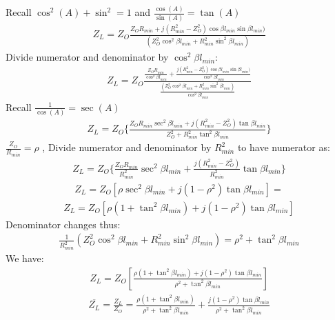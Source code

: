 Recall $ \cos^{2}(A) + \sin^{2} = 1 $ and $ \frac{\cos(A)}{\sin(A)} = \tan(A) $
\begin{align}
Z_{L} = Z_{O}\frac{Z_{O}R_{min} + j(R_{min}^{2}-Z_{O}^{2})\cos\beta l_{min}\sin\beta l_{min})}{(Z_{O}^{2}\cos^{2}\beta l_{min} + R_{min}^{2}\sin^{2}\beta l_{min})}
\end{align}
Divide numerator and denominator by $\cos^{2}\beta l_{min}$:
\begin{align*}
Z_{L} = Z_{O}\frac{\frac{Z_{O}R_{min}}{\cos^{2}\beta l_{min}} + \frac{j(R_{min}^{2}-Z_{O}^{2})\cos\beta l_{min}\sin\beta l_{min})}{\cos^{2}\beta l_{min}}}{\frac{(Z_{O}^{2}\cos^{2}\beta l_{min} + R_{min}^{2}\sin^{2}\beta l_{min})}{\cos^{2}\beta l_{min}}}
\end{align*}
Recall $ \frac{1}{\cos(A)} = \sec(A) $
\begin{align}
Z_{L} = Z_{O}\{\frac{Z_{O}R_{min}\sec^{2}\beta l_{min} + j(R_{min}^{2}-Z_{O}^{2})\tan\beta l_{min}}{Z_{O}^{2}+ R_{min}^{2}\tan^{2}\beta l_{min}}\}
\end{align}
$\frac{Z_{O}}{R_{min}} = \rho$ , Divide numerator and denominator by $R_{min}^{2}$ to have numerator as:
\begin{align*}
Z_{L} = Z_{O}\{\frac{Z_{O}R_{min}}{R_{min}^{2}}\sec^{2}\beta l_{min} + \frac{j(R_{min}^{2}-Z_{O}^{2})}{{R_{min}^{2}}}\tan\beta l_{min}\}
\end{align*}
\begin{align*}
Z_{L} = Z_{O} [\rho \sec^{2}\beta l_{min} + j(1-\rho^{2})\tan\beta l_{min}] =
\end{align*}
\begin{align*}
Z_{L} = Z_{O} [ \rho (1 + \tan^{2}\beta l_{min}) + j(1-\rho^{2})\tan\beta l_{min}]
\end{align*}
Denominator changes thus:
\begin{align*}
\frac{1}{R_{min}^{2}}{(Z_{O}^{2}\cos^{2}\beta l_{min} + R_{min}^{2}\sin^{2}\beta l_{min})} = \rho^{2} + \tan^{2}\beta l_{min}
\end{align*}
We have:
\begin{align}
Z_{L} = Z_{O} [\frac{\rho (1 + \tan^{2}\beta l_{min}) + j(1-\rho^{2})\tan\beta l_{min}}{\rho^{2} + \tan^{2}\beta l_{min}} ]
\end{align}
\begin{align*}
\overline{Z_{L}} = \frac{Z_{L}}{Z_{O}} =  \frac{\rho (1 + \tan^{2}\beta l_{min})}{\rho^{2} + \tan^{2}\beta l_{min}} + \frac{j(1-\rho^{2})\tan\beta l_{min}}{\rho^{2} + \tan^{2}\beta l_{min}}
\end{align*}

